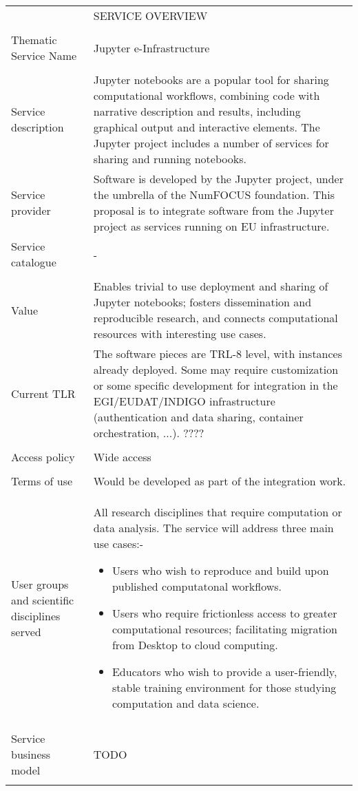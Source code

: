 \begin{tabular}{|p{5cm}|p{9cm}|}
\hline
 & SERVICE OVERVIEW\\
\\\hline
Thematic Service Name&Jupyter e-Infrastructure\\
\\\hline
Service description&Jupyter notebooks are a popular tool for sharing
computational workflows, combining code with narrative description and results,
including graphical output and interactive elements. The Jupyter project
includes a number of services for sharing and running notebooks.
\\\hline
Service provider&Software is developed by the Jupyter project, under the
umbrella of the NumFOCUS foundation. This proposal is to integrate software from
the Jupyter project as services running on EU infrastructure.
\\\hline
Service catalogue&-\\
\\\hline
Value&Enables trivial to use deployment and sharing of
Jupyter notebooks; fosters dissemination and reproducible research,
and connects computational resources with interesting use cases.
\\\hline
Current TLR&The software pieces
are TRL-8 level, with instances already deployed. Some may require
customization or some specific development for integration in the
EGI/EUDAT/INDIGO infrastructure (authentication and data sharing,
container orchestration, ...).  ????\\
\\\hline
Access policy&Wide access\\
\\\hline
Terms of use&Would be developed as part of the integration work.
\\\hline
User groups and scientific disciplines served&All research
disciplines that require computation or data analysis. The service
will address three main use cases:-
\begin{itemize}
\item Users who wish to reproduce and build upon published
  computatonal workflows.
\item Users who require frictionless access to greater computational
  resources; facilitating migration from Desktop to cloud computing.
\item Educators who wish to provide a user-friendly, stable training
  environment for those studying computation and data science.
\end{itemize}\\
\\\hline
Service business model&TODO\\
\\\hline
\end{tabular}

